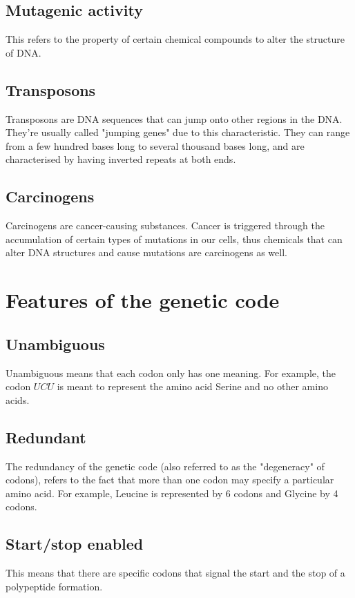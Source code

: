 \documentclass[11pt]{article}
\begin{document}
\subsection{Mutagenic activity}
\label{sec:org3eaa456}
This refers to the property of certain chemical compounds to alter the structure of DNA.
\subsection{Transposons}
\label{sec:org1dd9c75}
Transposons are DNA sequences that can jump onto other regions in the DNA. They're usually called "jumping genes" due to this characteristic. They can range from a few hundred bases long to several thousand bases long, and are characterised by having inverted repeats at both ends.
\subsection{Carcinogens}
\label{sec:org99a280b}
Carcinogens are cancer-causing substances. Cancer is triggered through the accumulation of certain types of mutations in our cells, thus chemicals that can alter DNA structures and cause mutations are carcinogens as well.

\newpage
\section{Features of the genetic code}
\label{sec:orgcb6b5ff}

\subsection{Unambiguous}
\label{sec:org2d100f3}
Unambiguous means that each codon only has one meaning. For example, the codon \(UCU\) is meant to represent the amino acid Serine and no other amino acids.
\subsection{Redundant}
\label{sec:orgf8dbb22}
The redundancy of the genetic code (also referred to as the "degeneracy" of codons), refers to the fact that more than one codon may specify a particular amino acid. For example, Leucine is represented by 6 codons and Glycine by 4 codons.
\subsection{Start/stop enabled}
\label{sec:org221822f}
This means that there are specific codons that signal the start and the stop of a polypeptide formation.
\end{document}
